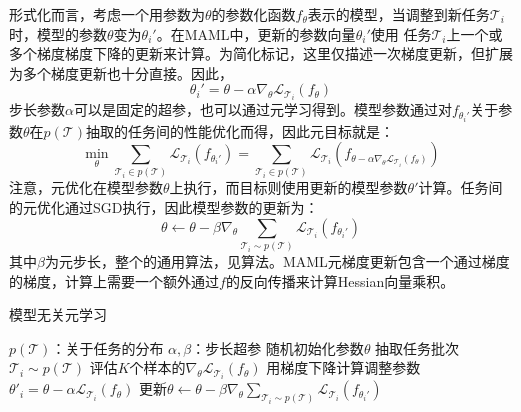 \documentclass[11pt,twoside,a4paper]{ctexart}
\begin{document}
形式化而言，考虑一个用参数为$\theta$的参数化函数$f_\theta$表示的模型，当调整到新任务$\mathcal T_i$时，模型的参数$\theta$变为$\theta_i'$。在MAML中，更新的参数向量$\theta_i'$使用
任务$\mathcal T_i$上一个或多个梯度梯度下降的更新来计算。为简化标记，这里仅描述一次梯度更新，但扩展为多个梯度更新也十分直接。因此，
\[ \theta_i' = \theta - \alpha\nabla_\theta\mathcal L_{\mathcal T_i}\left(f_\theta\right) \]
步长参数$\alpha$可以是固定的超参，也可以通过元学习得到。模型参数通过对$f_{\theta_i'}$关于参数$\theta$在$p(\mathcal T)$抽取的任务间的性能优化而得，因此元目标就是：
\[
\min_\theta \sum_{\mathcal T_i \in p(\mathcal T)} \mathcal L_{\mathcal T_i}\left(f_{\theta_i'}\right)
=\sum_{\mathcal T_i \in p(\mathcal T)} \mathcal L_{\mathcal T_i}\left(f_{\theta - \alpha\nabla_\theta\mathcal L_{\mathcal T_i}\left(f_\theta\right)}\right)
\]
注意，元优化在模型参数$\theta$上执行，而目标则使用更新的模型参数$\theta'$计算。任务间的元优化通过SGD执行，因此模型参数的更新为：
\begin{equation}
	\theta \gets \theta - \beta\nabla_\theta \sum_{\mathcal T_i \sim p(\mathcal T)} \mathcal L_{\mathcal T_i}\left( f_{\theta_i'} \right)
\end{equation}
其中$\beta$为元步长，整个的通用算法，见算法。MAML元梯度更新包含一个通过梯度的梯度，计算上需要一个额外通过$f$的反向传播来计算Hessian向量乘积。

\begin{algorithm}
	\caption{模型无关元学习}
	\label{alg1}
	\begin{algorithmic}[1]
		\Require $p(\mathcal T)$：关于任务的分布
		\Require $\alpha,\beta$：步长超参
		\State 随机初始化参数$\theta$
			\State 抽取任务批次$\mathcal T_i \sim p(\mathcal T)$
				\State 评估$K$个样本的$\nabla_\theta\mathcal L_{\mathcal T_i}\left( f_\theta \right)$
				\State 用梯度下降计算调整参数$\theta'_i=\theta-\alpha\mathcal{L}_{\mathcal{T}_i}\left( f_\theta \right)$
			\EndFor
		\State 更新$\theta \gets \theta - \beta\nabla_\theta\sum_{\mathcal{T}_i\sim p(\mathcal{T})}\mathcal{L}_{\mathcal{T}_i}\left( f_{\theta_i'}\right)$
		\EndWhile
	\end{algorithmic}
\end{algorithm}
\end{document}

